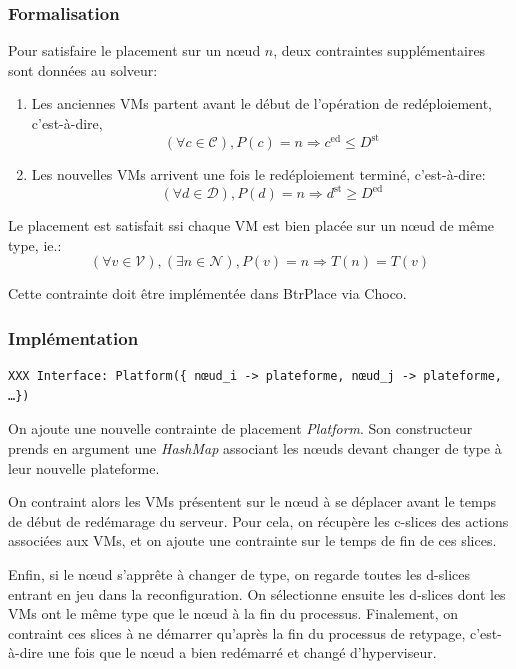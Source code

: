 \documentclass[a4paper]{article}
\begin{document}
\subsubsection{Formalisation}
Pour satisfaire le placement sur un nœud $n$, deux contraintes supplémentaires sont
données au solveur:

\begin{enumerate}
	\item Les anciennes VMs partent avant le début de l'opération de
		redéploiement, c'est-à-dire,
\[
	(\forall c \in \mathcal C), P(c) = n \Rightarrow c^\mathrm{ed} \leq D^\mathrm{st}
\]
	\item Les nouvelles VMs arrivent une fois le redéploiement terminé,
		c'est-à-dire:
\[
	(\forall d \in \mathcal D), P(d) = n \Rightarrow d^\mathrm{st} \geq D^\mathrm{ed}
\]
\end{enumerate}
Le placement est satisfait ssi chaque VM est bien placée sur
un nœud de même type, ie.:
\[
	(\forall v \in \mathcal V), (\exists n \in \mathcal N), P(v) = n
		\Rightarrow T(n) = T(v)	
\]

Cette contrainte doit être implémentée dans BtrPlace via Choco.

\subsubsection{Implémentation}

\begin{verbatim}
XXX Interface: Platform({ nœud_i -> plateforme, nœud_j -> plateforme, …})
\end{verbatim}

On ajoute une nouvelle contrainte de placement \textit{Platform}. Son
constructeur prends en argument une \textit{HashMap} associant les
nœuds devant changer de type à leur nouvelle plateforme.

On contraint alors les VMs présentent sur le nœud à se déplacer
avant le temps de début de redémarage du serveur. Pour cela, on
récupère les c-slices des actions associées aux VMs, et on ajoute
une contrainte sur le temps de fin de ces slices.

Enfin, si le nœud s'apprête à changer de type, on regarde toutes
les d-slices entrant en jeu dans la reconfiguration. On sélectionne
ensuite les d-slices dont les VMs ont le même type que le nœud à la fin
du processus. Finalement, on contraint ces slices à ne démarrer
qu'après la fin du processus de retypage, c'est-à-dire une fois que
le nœud a bien redémarré et changé d'hyperviseur.
\end{document}

